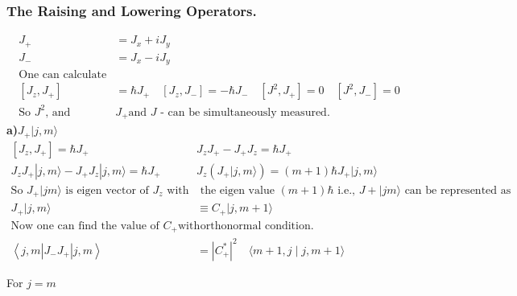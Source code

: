 \subsubsection{The Raising and Lowering Operators.}
\begin{align*}
J_{+}&=J_{x}+i J_{y}\\
J_{-}&=J_{x}-i J_{y}\\
\text{One can calculate}\\
\left[J_{z}, J_{+}\right]&=\hbar J_{+} \quad\left[J_{z}, J_{-}\right]=-\hbar J_{-} \quad\left[J^{2}, J_{+}\right]=0 \quad\left[J^{2}, J_{-}\right]=0\\
\text{So $J^{2}$, and }&\text{$J_{+}$and $J$ - can be simultaneously measured.}
\end{align*}
\textbf{a)\quad$J_{+}|j, m\rangle$}\\
\begin{align*}
{\left[J_{z}, J_{+}\right]=\hbar J_{+}} \hspace{1cm} &J_{z} J_{+}-J_{+} J_{z}=\hbar J_{+} \\
J_{z} J_{+}|j, m\rangle-J_{+} J_{z}|j, m\rangle=\hbar J_{+} \hspace{1cm} &J_{z}\left(J_{+}|j, m\rangle\right)=(m+1) \hbar J_{+}|j, m\rangle\\
\text{So $J_{+}|j m\rangle$ is  eigen vector of $J_{z}$ with }&\text{ the eigen value $(m+1) \hbar$ i.e., $J+|j m\rangle$ can be represented as}\\
J_{+}|j, m\rangle &\equiv C_{+}|j, m+1\rangle\\
\text{Now one can find the value of  $C_{+}$with}&\text{ orthonormal condition.}\\
\left\langle j, m\left|J_{-} J_{+}\right| j, m\right\rangle&=\left|C_{+}^{*}\right|^{2} \quad\langle m+1, j \mid j, m+1\rangle
\end{align*}
\begin{center}
\end{center}
\hspace{4cm}For $j=m$\hspace{1cm}
